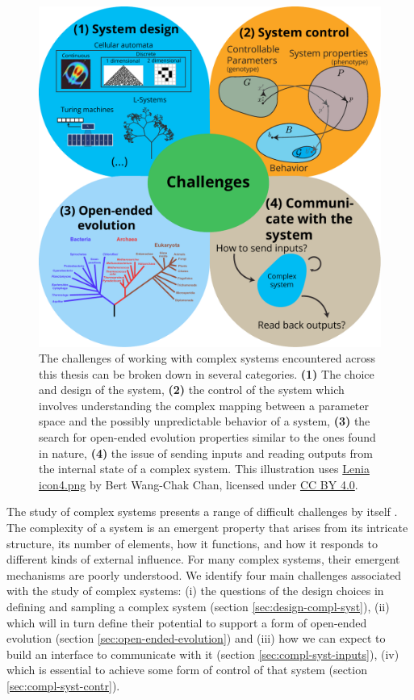 \begin{figure}[htbp]
  \centering
  \includegraphics[width=.98\linewidth]{figures/challenges}
  \caption{The challenges of working with complex systems encountered across
    this thesis can be broken down in several categories. \textbf{(1)} The choice
    and design of the system, \textbf{(2)} the control of the system which
    involves understanding the complex mapping between a parameter space and the
    possibly unpredictable behavior of a system, \textbf{(3)} the search for
    open-ended evolution properties similar to the ones found in nature,
    \textbf{(4)} the issue of sending inputs and reading outputs from the
    internal state of a complex system. This illustration uses
    \href{https://commons.wikimedia.org/wiki/File:Lenia_icon4.png}{Lenia
      icon4.png} by Bert Wang-Chak Chan, licensed under
    \href{https://creativecommons.org/licenses/by-sa/4.0/}{CC BY 4.0}. }
  \label{fig:challenges}
\end{figure}

The study of complex systems presents a range of difficult challenges by itself
\parencite{sanmiguelChallengesComplexSystems2012}. The complexity of a
system is an emergent property that arises from its intricate structure, its
number of elements, how it functions, and how it responds to different kinds of
external influence. For many complex systems, their emergent mechanisms are
poorly understood. We identify four main challenges associated with the study of
complex systems: (i) the questions of the design choices in defining and sampling a
complex system (section \ref{sec:design-compl-syst}), (ii) which will in turn define
their potential to support a form of open-ended evolution (section
\ref{sec:open-ended-evolution}) and (iii) how we can expect to build an interface to
communicate with it (section \ref{sec:compl-syst-inputs}), (iv) which is essential to
achieve some form of control of that system (section \ref{sec:compl-syst-contr}).

